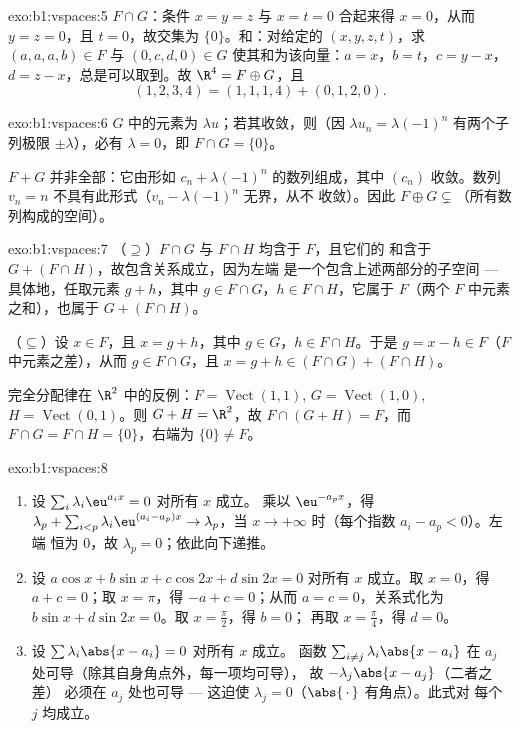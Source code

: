 \begin{solution}{exo:b1:vspaces:5}
$F \cap G$：条件 $x = y = z$ 与 $x = t = 0$ 合起来得
$x = 0$，从而 $y = z = 0$，且 $t = 0$，故交集为
$\{0\}$。和：对给定的 $(x,y,z,t)$，求 $(a,a,a,b) \in F$ 与
$(0,c,d,0) \in G$ 使其和为该向量：$a = x$，$b = t$，$c = y - x$，$d =
z - x$，总是可以取到。故 $\R^4 = F \oplus G$，且
\[
(1,2,3,4) = (1,1,1,4) + (0,1,2,0) .
\]
\end{solution}

\begin{solution}{exo:b1:vspaces:6}
$G$ 中的元素为 $\lambda u$；若其收敛，则（因
$\lambda u_n = \lambda(-1)^n$ 有两个子列极限 $\pm
\lambda$），必有 $\lambda = 0$，即 $F \cap G = \{0\}$。

$F + G$ 并非全部：它由形如
$c_n + \lambda(-1)^n$ 的数列组成，其中 $(c_n)$ 收敛。数列 $v_n =
n$ 不具有此形式（$v_n - \lambda(-1)^n$ 无界，从不
收敛）。因此 $F \oplus G \subsetneq$（所有数列构成的空间）。
\end{solution}

\begin{solution}{exo:b1:vspaces:7}
（$\supseteq$）$F \cap G$ 与 $F \cap H$ 均含于 $F$，且它们的
和含于 $G + (F \cap H)$，故包含关系成立，因为左端
是一个包含上述两部分的子空间 --- 具体地，任取元素 $g +
h$，其中 $g \in F\cap G$，$h \in F \cap H$，它属于 $F$（两个
$F$ 中元素之和），也属于 $G + (F \cap H)$。

（$\subseteq$）设 $x \in F$，且 $x = g + h$，其中 $g \in G$，$h \in F
\cap H$。于是 $g = x - h \in F$（$F$ 中元素之差），从而
$g \in F \cap G$，且 $x = g + h \in (F \cap G) + (F \cap H)$。

完全分配律在 $\R^2$ 中的反例：$F =
\operatorname{Vect}(1,1)$, $G = \operatorname{Vect}(1,0)$, $H =
\operatorname{Vect}(0,1)$。则 $G + H = \R^2$，故 $F \cap (G+H) =
F$，而 $F \cap G = F \cap H = \{0\}$，右端为 $\{0\}
\neq F$。
\end{solution}

\begin{solution}{exo:b1:vspaces:8}
\begin{enumerate}
  \item 设 $\sum_{i} \lambda_i \eu^{a_i x} = 0$ 对所有 $x$ 成立。
        乘以 $\eu^{-a_p x}$，得 $\lambda_p + \sum_{i < p}
        \lambda_i \eu^{(a_i - a_p)x} \to \lambda_p$，当 $x \to
        +\infty$ 时（每个指数 $a_i - a_p < 0$）。左端
        恒为 $0$，故 $\lambda_p = 0$；依此向下递推。
  \item 设 $a\cos x + b \sin x + c \cos 2x + d\sin 2x = 0$ 对所有
        $x$ 成立。取 $x = 0$，得 $a + c = 0$；取 $x = \pi$，得 $-a + c
        = 0$；从而 $a = c = 0$，关系式化为 $b\sin
        x + d \sin 2x = 0$。取 $x = \frac\pi2$，得 $b = 0$；
        再取 $x = \frac\pi4$，得 $d = 0$。
  \item 设 $\sum \lambda_i \abs{x - a_i} = 0$ 对所有 $x$ 成立。
        函数 $\sum_{i \neq j} \lambda_i\abs{x - a_i}$ 在
        $a_j$ 处可导（除其自身角点外，每一项均可导），
        故 $-\lambda_j \abs{x - a_j}$（二者之差）
        必须在 $a_j$ 处也可导 --- 这迫使
        $\lambda_j = 0$（$\abs{\,\cdot\,}$ 有角点）。此式对
        每个 $j$ 均成立。
\end{enumerate}
\end{solution}

